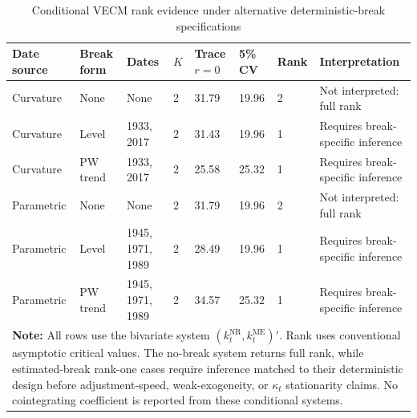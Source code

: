 \begin{table}[h!]
\centering\scriptsize
\caption{Conditional VECM rank evidence under alternative deterministic-break specifications}
\label{tab:vecm}
\begin{tabular}{p{1.65cm}p{1.7cm}p{1.9cm}p{0.5cm}p{1.0cm}p{0.95cm}p{0.90cm}p{3.00cm}}
\toprule
\textbf{Date source} & \textbf{Break form} & \textbf{Dates} & \textbf{$K$} & \textbf{Trace $r=0$} & \textbf{5\% CV} & \textbf{Rank} & \textbf{Interpretation}\\
\midrule
Curvature & None & None & 2 & 31.79 & 19.96 & 2 & Not interpreted: full rank \\
Curvature & Level & 1933, 2017 & 2 & 31.43 & 19.96 & 1 & Requires break-specific inference \\
Curvature & PW trend & 1933, 2017 & 2 & 25.58 & 25.32 & 1 & Requires break-specific inference \\
Parametric & None & None & 2 & 31.79 & 19.96 & 2 & Not interpreted: full rank \\
Parametric & Level & 1945, 1971, 1989 & 2 & 28.49 & 19.96 & 1 & Requires break-specific inference \\
Parametric & PW trend & 1945, 1971, 1989 & 2 & 34.57 & 25.32 & 1 & Requires break-specific inference \\
\bottomrule
\multicolumn{8}{p{13.1cm}}{\footnotesize \textbf{Note:} All rows use the bivariate system $(k_t^{\mathrm{NR}},k_t^{\mathrm{ME}})'$. Rank uses conventional asymptotic critical values. The no-break system returns full rank, while estimated-break rank-one cases require inference matched to their deterministic design before adjustment-speed, weak-exogeneity, or $\kappa_t$ stationarity claims. No cointegrating coefficient is reported from these conditional systems.}
\end{tabular}
\end{table}
